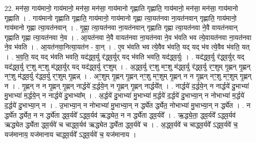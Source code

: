 \documentclass[17pt]{extarticle}
\begin{document}
22. मन॑सा॒ गाय॑मानो॒ गाय॑मानो॒ मन॑सा॒ मन॑सा॒ गाय॑मानो गृह्णाति गृह्णाति॒ गाय॑मानो॒ मन॑सा॒ मन॑सा॒ गाय॑मानो गृह्णाति । . गाय॑मानो गृह्णाति गृह्णाति॒ गाय॑मानो॒ गाय॑मानो गृह्णा त्या॒यत॑नवा ना॒यत॑नवान् गृह्णाति॒ गाय॑मानो॒ गाय॑मानो गृह्णा त्या॒यत॑नवान् । . गृ॒ह्णा॒ त्या॒यत॑नवा ना॒यत॑नवान् गृह्णाति गृह्णा त्या॒यत॑नवा ने॒वै वायत॑नवान् गृह्णाति गृह्णा त्या॒यत॑नवा ने॒व । . आ॒यत॑नवा ने॒वै वायत॑नवा ना॒यत॑नवा ने॒व भ॑वति भव त्ये॒वायत॑नवा ना॒यत॑नवा ने॒व भ॑वति । . आ॒यत॑नवा॒नित्या॒यत॑न - वा॒न् । . ए॒व भ॑वति भव त्ये॒वैव भ॑वति॒ यद् यद् भ॑व त्ये॒वैव भ॑वति॒ यत् । . भ॒व॒ति॒ यद् यद् भ॑वति भवति॒ यद॑द्ध्व॒र्यु र॑द्ध्व॒र्युर् यद् भ॑वति भवति॒ यद॑द्ध्व॒र्युः । . यद॑द्ध्व॒र्यु र॑द्ध्व॒र्युर् यद् यद॑द्ध्व॒र्यु रꣳ॒॒शु मꣳ॒॒शु म॑द्ध्व॒र्युर् यद् यद॑द्ध्व॒र्यु रꣳ॒॒शुम् । . अ॒द्ध्व॒र्यु रꣳ॒॒शु मꣳ॒॒शु म॑द्ध्व॒र्यु र॑द्ध्व॒र्यु रꣳ॒॒शुम् गृ॒ह्णन् गृ॒ह्णन् नꣳ॒॒शु म॑द्ध्व॒र्यु र॑द्ध्व॒र्यु रꣳ॒॒शुम् गृ॒ह्णन्न् । . अꣳ॒॒शुम् गृ॒ह्णन् गृ॒ह्णन् नꣳ॒॒शु मꣳ॒॒शुम् गृ॒ह्णन् न न गृ॒ह्णन् नꣳ॒॒शु मꣳ॒॒शुम् गृ॒ह्णन् न । . गृ॒ह्णन् न न गृ॒ह्णन् गृ॒ह्णन् नार्द्धये॑ द॒र्द्धये॒न् न गृ॒ह्णन् गृ॒ह्णन् नार्द्धये᳚त् । . नार्द्धये॑ द॒र्द्धये॒न् न नार्द्धये॑ दु॒भाभ्या॑ मु॒भाभ्या॑ म॒र्द्धये॒न् न नार्द्धये॑ दु॒भाभ्या᳚म् । . अ॒र्द्धये॑ दु॒भाभ्या॑ मु॒भाभ्या॑ म॒र्द्धये॑ द॒र्द्धये॑ दु॒भाभ्या॒न् न नोभाभ्या॑ म॒र्द्धये॑ द॒र्द्धये॑ दु॒भाभ्या॒न् न । . उ॒भाभ्या॒न् न नोभाभ्या॑ मु॒भाभ्या॒न् न र्द्ध्ये॑त र्द्ध्येत॒ नोभाभ्या॑ मु॒भाभ्या॒न् न र्द्ध्ये॑त । . न र्द्ध्ये॑त र्द्ध्येत॒ न न र्द्ध्ये॑ता द्ध्व॒र्यवे᳚ ऽद्ध्व॒र्यव॑ ऋद्ध्येत॒ न न र्द्ध्ये॑ता द्ध्व॒र्यवे᳚ । . ऋ॒द्ध्ये॒ता॒ द्ध्व॒र्यवे᳚ ऽद्ध्व॒र्यव॑ ऋद्ध्येत र्द्ध्येता द्ध्व॒र्यवे॑ च चाद्ध्व॒र्यव॑ ऋद्ध्येत र्द्ध्येता द्ध्व॒र्यवे॑ च । . अ॒द्ध्व॒र्यवे॑ च चाद्ध्व॒र्यवे᳚ ऽद्ध्व॒र्यवे॑ च॒ यज॑मानाय॒ यज॑मानाय चाद्ध्व॒र्यवे᳚ ऽद्ध्व॒र्यवे॑ च॒ यज॑मानाय । \newline
\end{document}
